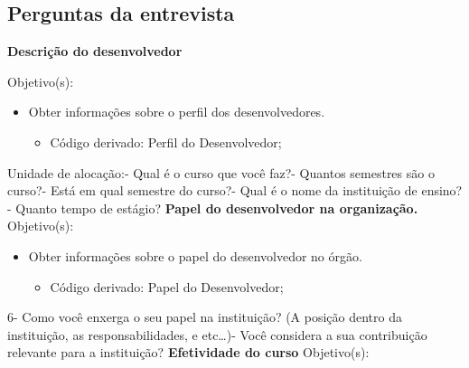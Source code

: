 \begin{anexosenv}

\partanexos
\chapter{Perguntas da entrevista}

\begin{flushleft}
\textbf{Descrição do desenvolvedor}
\end{flushleft}
Objetivo(s):
\begin{itemize}
\item Obter informações sobre o perfil dos desenvolvedores.
\begin{itemize}
\item Código derivado: Perfil do Desenvolvedor;
\end{itemize}
\end{itemize}
Unidade de alocação:\newline{}- Qual é o curso que você faz?- Quantos semestres são o curso?- Está em qual semestre do curso?- Qual é o nome da instituição de ensino?- Quanto tempo de estágio?\newline
\newline
\textbf{Papel do desenvolvedor na organização.}\newline\newline
Objetivo(s):
\begin{itemize}
\item Obter informações sobre o papel do desenvolvedor no órgão.
\begin{itemize}
\item Código derivado: Papel do Desenvolvedor;
\end{itemize}
\end{itemize}
6- Como você enxerga o seu papel na instituição? (A posição dentro da instituição, as responsabilidades, e etc…)- Você considera a sua contribuição relevante para a instituição?\newline
    \newline
\textbf{Efetividade do curso}\newline\newline
Objetivo(s):
\begin{itemize}

\end{itemize}
\end{anexosenv}
